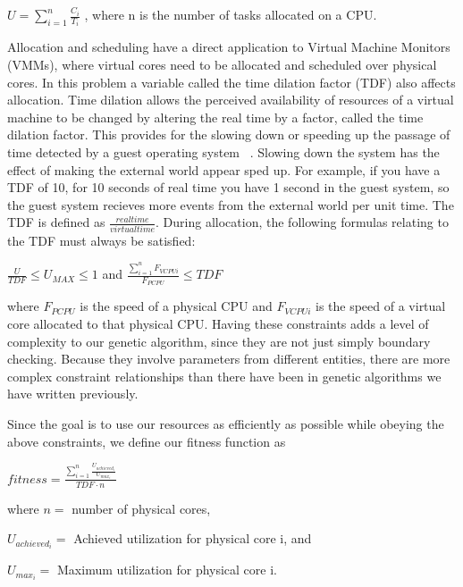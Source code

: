 \documentclass[11pt]{article}
\begin{document}
\begin{center}
$U = \sum_{i=1}^{n} \frac{C_{i}}{T_{i}}$ , where n is the number of tasks allocated on a CPU.
\end{center}

Allocation and scheduling have a direct application to Virtual Machine Monitors (VMMs), where virtual cores need to be allocated and scheduled over physical cores. In this problem a variable called the time dilation factor (TDF) also affects allocation. Time dilation allows the perceived availability of resources of a virtual machine to be changed by altering the real time by a factor, called the time dilation factor. This provides for the slowing down or speeding up the passage of time detected by a guest operating system ~\cite{Gupta:06}. Slowing down the system has the effect of making the external world appear sped up. For example, if you have a TDF of 10, for 10 seconds of real time you have 1 second in the guest system, so the guest system recieves more events from the external world per unit time. The TDF is defined as $\frac{real time}{virtual time}$. During allocation, the following formulas relating to the TDF must always be satisfied:

\begin{center}
$\frac{U}{TDF} \leq U_{MAX} \leq 1$ and
$\frac{\sum_{i=1}^{n} F_{VCPUi} }{F_{PCPU}} \leq TDF$
\end{center}

where $F_{PCPU}$ is the speed of a physical CPU and $F_{VCPUi}$ is the speed of a virtual core allocated to that physical CPU. Having these constraints adds a level of complexity to our genetic algorithm, since they are not just simply boundary checking. Because they involve parameters from different entities, there are more complex constraint relationships than there have been in genetic algorithms we have written previously.

Since the goal is to use our resources as efficiently as possible while obeying the above constraints, we define our fitness function as

\begin{center}

$fitness = \frac{\sum_{i=1}^{n} \frac{U_{achieved_i}}{U_{max_i}}}{TDF \cdot n}$

\begin{flushleft}
where $n =$ number of physical cores, 

$U_{achieved_{i}} =$ Achieved utilization for physical core i, and

$U_{max_{i}} =$ Maximum utilization for physical core i.
\end{flushleft}

\end{center}
\end{document}

